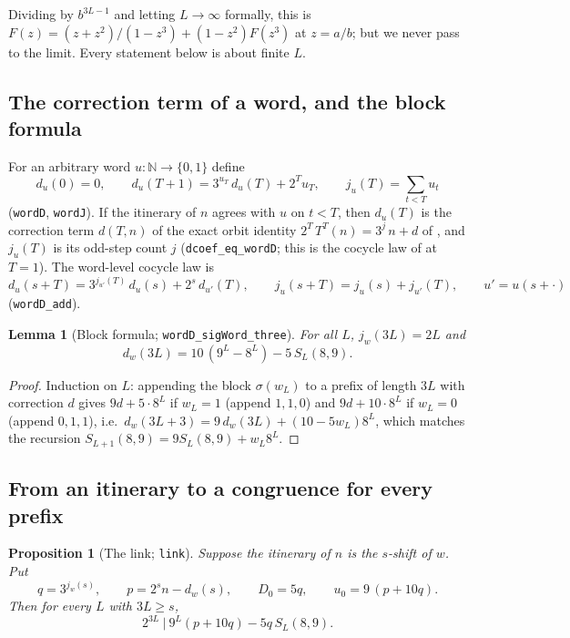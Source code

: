 \documentclass[11pt]{article}
\newtheorem{lemma}[theorem]{Lemma}
\newtheorem{proposition}[theorem]{Proposition}
\theoremstyle{definition}
\newcommand{\N}{\mathbb{N}}
\newcommand{\code}[1]{\texttt{#1}}
\begin{document}
Dividing by $b^{3L-1}$ and letting $L \to \infty$ formally, this is
$F(z) = (z+z^2)/(1-z^3) + (1-z^2)F(z^3)$ at $z = a/b$; but we never
pass to the limit. Every statement below is about finite $L$.

\subsection{The correction term of a word, and the block formula}

For an arbitrary word $u\colon \N \to \{0,1\}$ define
\[
d_u(0) = 0, \qquad d_u(T+1) = 3^{u_T}\, d_u(T) + 2^T u_T, \qquad
j_u(T) = \sum_{t<T} u_t
\]
(\code{wordD}, \code{wordJ}). If the itinerary of $n$ agrees with $u$
on $t < T$, then $d_u(T)$ is the correction term $d(T,n)$ of the exact
orbit identity $2^T\,T^T(n) = 3^{j}\,n + d$ of \cite{companion}, and
$j_u(T)$ is its odd-step count $j$ (\code{dcoef\_eq\_wordD}; this is
the cocycle law of \cite{companion} at $T = 1$). The word-level
cocycle law is
\begin{equation}\label{eq:cocycle}
d_u(s+T) = 3^{j_{u'}(T)}\, d_u(s) + 2^s\, d_{u'}(T), \qquad
j_u(s+T) = j_u(s) + j_{u'}(T), \qquad u' = u(s + \cdot)
\end{equation}
(\code{wordD\_add}).

\begin{lemma}[Block formula; \code{wordD\_sigWord\_three}]
\label{lem:block}
For all $L$, $j_w(3L) = 2L$ and
\[
d_w(3L) = 10\,(9^L - 8^L) - 5\, S_L(8,9).
\]
\end{lemma}

\begin{proof}
Induction on $L$: appending the block $\sigma(w_L)$ to a prefix of
length $3L$ with correction $d$ gives $9d + 5\cdot 8^L$ if $w_L = 1$
(append $1,1,0$) and $9d + 10 \cdot 8^L$ if $w_L = 0$ (append $0,1,1$),
i.e.\ $d_w(3L+3) = 9\,d_w(3L) + (10 - 5w_L)8^L$, which matches the
recursion $S_{L+1}(8,9) = 9 S_L(8,9) + w_L 8^L$.
\end{proof}

\subsection{From an itinerary to a congruence for every prefix}

\begin{proposition}[The link; \code{link}]\label{prop:link}
Suppose the itinerary of $n$ is the $s$-shift of $w$. Put
\[
q = 3^{j_w(s)}, \qquad p = 2^s n - d_w(s), \qquad
D_0 = 5q, \qquad u_0 = 9\,(p + 10q).
\]
Then for every $L$ with $3L \ge s$,
\begin{equation}\label{eq:link}
2^{3L} \ \Big|\ 9^L (p + 10 q) - 5 q\, S_L(8,9).
\end{equation}
\end{proposition}
\end{document}
